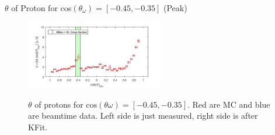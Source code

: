 \documentclass[
		10pt
		]{beamer}
\begin{document}
\begin{frame}{$ \theta$ of Proton for cos$(\theta_{\omega})=[-0.45,-0.35]$ (Peak)}
	
	\begin{figure}
		\hspace{0cm}  \vspace{-1cm}
		\includegraphics[width=6cm]{Plots/6}
	\end{figure}
	
	
	\begin{figure}%
		\centering
		\qquad
		\captionsetup{labelformat=empty}
		\caption{$\theta$ of protons for $\textrm{cos}(\theta{\omega}) = [-0.45, -0.35] $. Red are MC and blue are beamtime data. Left side is just measured, right side is after KFit.}%
		\label{fig:example}%
	\end{figure}
	
\end{frame}
\end{document}
